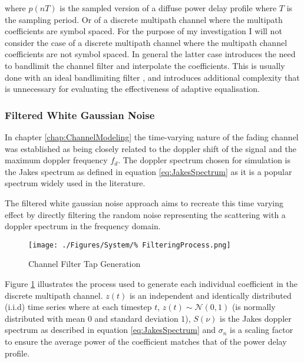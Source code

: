 where $p(nT)$ is the sampled version of a diffuse power %
delay profile where $T$ is the sampling period. Or of a %
discrete multipath channel where the multipath coefficients %
are symbol spaced. For the purpose of my investigation I %
will not consider the case of a discrete multipath channel %
where the multipath channel coefficients are not symbol %
spaced. In general the latter case introduces the need %
to bandlimit the channel filter and interpolate the coefficients. %
This is usually done with an ideal bandlimiting filter %
\cite{Jer00}, and introduces additional complexity that %
is unnecessary for evaluating the effectiveness of %
adaptive equalisation.

\subsubsection{Filtered White Gaussian Noise}

In chapter \ref{chap:ChannelModeling} the time-varying nature of %
the fading channel was established as being closely related to the %
doppler shift of the signal and the maximum doppler frequency $f_d$. %
The doppler spectrum chosen for simulation is the Jakes spectrum as %
defined in equation \ref{eq:JakesSpectrum} as it is a popular spectrum %
widely used in the literature. %

The filtered white gaussian noise approach aims to recreate this %
time varying effect by directly filtering the random noise representing %
the scattering with a doppler spectrum in the frequency domain\cite{%
MIMO-OFDM10, Iskander}. 
\begin{figure}[ht]
	\texttt{[image: ./Figures/System/\%
	FilteringProcess.png]}
	\caption{Channel Filter Tap Generation}
	\label{fig:ChannelFilterSimulation}
\end{figure}
Figure \ref{fig:ChannelFilterSimulation} illustrates the process %
used to generate each individual coefficient in the discrete %
multipath channel. $z(t)$ is an independent and identically %
distributed (i.i.d) time series where at each timestep $t$, %
$z(t)\sim\mathcal{N}(0,1)$ (is normally distributed %
with mean $0$ and standard deviation $1$), $S(\nu)$ is the %
Jakes doppler spectrum as described in equation %
\ref{eq:JakesSpectrum} and $\sigma_n$ is %
a scaling factor to ensure the average power of the coefficient %
matches that of the power delay profile.

